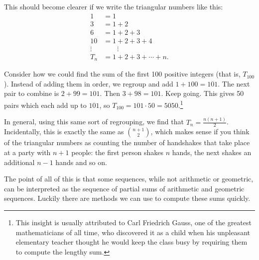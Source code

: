 \documentclass[10pt,]{book}
\theoremstyle{plain}
\theoremstyle{definition}
\theoremstyle{definition}
\theoremstyle{definition}
\theoremstyle{definition}
\numberwithin{equation}{chapter}
\newcommand{\amp}{&}
\begin{document}
\par
\hypertarget{p-136}{}%
This should become clearer if we write the triangular numbers like this:%
\begin{align*}
1 \amp = 1\\
3 \amp = 1+2\\
6 \amp = 1 + 2 + 3\\
10 \amp = 1+2 + 3+ 4\\
\vdots \amp \qquad \vdots\\
T_n \amp = 1 + 2 + 3 + \cdots + n.
\end{align*}
%
\par
\hypertarget{p-137}{}%
Consider how we could find the sum of the first 100 positive integers (that is, \(T_{100}\)). Instead of adding them in order, we regroup and add \(1+100 = 101\). The next pair to combine is \(2+99 = 101\). Then \(3+98 = 101\). Keep going. This gives 50 pairs which each add up to \(101\), so \(T_{100} = 101\cdot 50 = 5050\).\footnote{This insight is usually attributed to Carl Friedrich Gauss, one of the greatest mathematicians of all time, who discovered it as a child when his unpleasant elementary teacher thought he would keep the class busy by requiring them to compute the lengthy sum.\label{fn-1}}%
\par
\hypertarget{p-138}{}%
In general, using this same sort of regrouping, we find that \(T_n = \frac{n(n+1)}{2}\). Incidentally, this is exactly the same as \({n+1 \choose 2}\), which makes sense if you think of the triangular numbers as counting the number of handshakes that take place at a party with \(n+1\) people: the first person shakes \(n\) hands, the next shakes an additional \(n-1\) hands and so on.%
\par
\hypertarget{p-139}{}%
The point of all of this is that some sequences, while not arithmetic or geometric, can be interpreted as the sequence of partial sums of arithmetic and geometric sequences. Luckily there are methods we can use to compute these sums quickly.%
\typeout{************************************************}
\typeout{************************************************}
\end{document}
